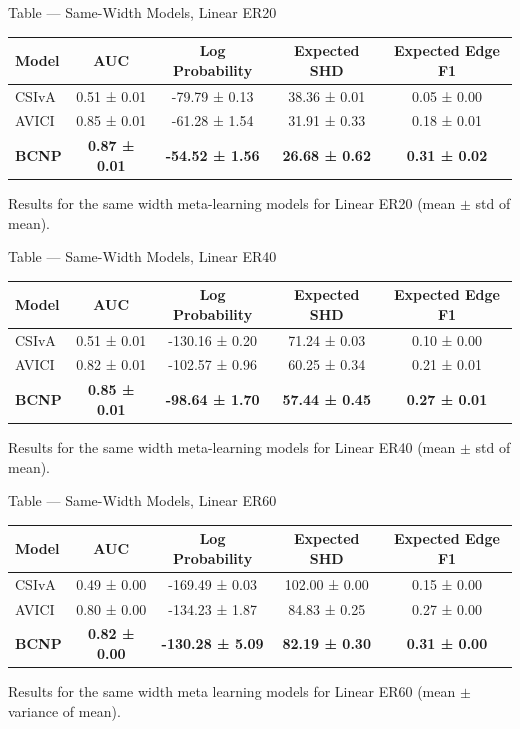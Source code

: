 \documentclass[aspectratio=169,10pt]{beamer}
\begin{document}
\begin{frame}{Table --- Same-Width Models, Linear ER20}
\centering
\begin{tabular}{lcccc}
\toprule
\textbf{Model} & \textbf{AUC} & \textbf{ Log Probability} & \textbf{Expected SHD} & \textbf{Expected Edge F1} \\
\midrule
CSIvA & 0.51 ± 0.01 & -79.79 ± 0.13 & 38.36 ± 0.01 & 0.05 ± 0.00 \\
AVICI & 0.85 ± 0.01 & -61.28 ± 1.54 & 31.91 ± 0.33 & 0.18 ± 0.01 \\
\textbf{BCNP} & \textbf{0.87 ± 0.01} & \textbf{-54.52 ± 1.56} & \textbf{26.68 ± 0.62} & \textbf{0.31 ± 0.02} \\
\bottomrule
\end{tabular}

\vspace{0.3cm}
{\footnotesize Results for the same width meta-learning models for Linear ER20 (mean $\pm$ std of mean).}
\end{frame}

\begin{frame}{Table --- Same-Width Models, Linear ER40}
\centering
\begin{tabular}{lcccc}
\toprule
\textbf{Model} & \textbf{AUC} & \textbf{ Log Probability} & \textbf{Expected SHD} & \textbf{Expected Edge F1} \\
\midrule
CSIvA & 0.51 ± 0.01 & -130.16 ± 0.20 & 71.24 ± 0.03 & 0.10 ± 0.00 \\
AVICI & 0.82 ± 0.01 & -102.57 ± 0.96 & 60.25 ± 0.34 & 0.21 ± 0.01 \\
\textbf{BCNP} & \textbf{0.85 ± 0.01} & \textbf{-98.64 ± 1.70} & \textbf{57.44 ± 0.45} & \textbf{0.27 ± 0.01} \\
\bottomrule
\end{tabular}

\vspace{0.3cm}
{\footnotesize Results for the same width meta-learning models for Linear ER40 (mean $\pm$ std of mean).}
\end{frame}

\begin{frame}{Table --- Same-Width Models, Linear ER60}
\centering
\begin{tabular}{lcccc}
\toprule
\textbf{Model} & \textbf{AUC} & \textbf{ Log Probability} & \textbf{Expected SHD} & \textbf{Expected Edge F1} \\
\midrule
CSIvA & 0.49 ± 0.00 & -169.49 ± 0.03 & 102.00 ± 0.00 & 0.15 ± 0.00 \\
AVICI & 0.80 ± 0.00 & -134.23 ± 1.87 & 84.83 ± 0.25 & 0.27 ± 0.00 \\
\textbf{BCNP} & \textbf{0.82 ± 0.00} & \textbf{-130.28 ± 5.09} & \textbf{82.19 ± 0.30} & \textbf{0.31 ± 0.00} \\
\bottomrule
\end{tabular}

\vspace{0.3cm}
{\footnotesize Results for the same width meta learning models for Linear ER60 (mean $\pm$ variance of mean).}
\end{frame}
\end{document}
